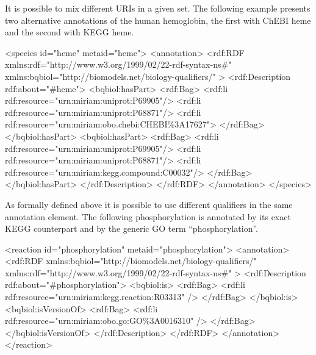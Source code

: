It is possible to mix different URIs in a given set. The
following example presents two alternative annotations of the human
hemoglobin, the first with ChEBI heme and the second with KEGG
heme.

\begin{blockChanged}
\begin{example}
<species id="heme" metaid="heme">
  <annotation>
    <rdf:RDF
      xmlns:rdf="http://www.w3.org/1999/02/22-rdf-syntax-ns\#"
      xmlns:bqbiol="http://biomodels.net/biology-qualifiers/"
    >
     <rdf:Description rdf:about="\#heme">
       <bqbiol:hasPart>
         <rdf:Bag>
           <rdf:li rdf:resource="urn:miriam:uniprot:P69905"/>
           <rdf:li rdf:resource="urn:miriam:uniprot:P68871"/>
           <rdf:li rdf:resource="urn:miriam:obo.chebi:CHEBI\%3A17627">
         </rdf:Bag>
       </bqbiol:hasPart>
       <bqbiol:hasPart>
         <rdf:Bag>
          <rdf:li rdf:resource="urn:miriam:uniprot:P69905"/>
           <rdf:li rdf:resource="urn:miriam:uniprot:P68871"/>
           <rdf:li rdf:resource="urn:miriam:kegg.compound:C00032"/>
         </rdf:Bag>
       </bqbiol:hasPart>
     </rdf:Description>
   </rdf:RDF>
  </annotation>
</species>
\end{example}
\end{blockChanged}

As formally defined above it is possible to use different
qualifiers in the same annotation element. The following
phosphorylation is annotated by its exact KEGG counterpart and by
the generic GO term ``phosphorylation''.

\begin{blockChanged}
\begin{example}
<reaction id="phosphorylation" metaid="phosphorylation">
  <annotation>
    <rdf:RDF
      xmlns:bqbiol="http://biomodels.net/biology-qualifiers/"
      xmlns:rdf="http://www.w3.org/1999/02/22-rdf-syntax-ns\#"
    >
      <rdf:Description rdf:about="\#phosphorylation">
        <bqbiol:is>
          <rdf:Bag>
            <rdf:li rdf:resource="urn:miriam:kegg.reaction:R03313" />
          </rdf:Bag>
        </bqbiol:is>
        <bqbiol:isVersionOf>
          <rdf:Bag>
            <rdf:li rdf:resource="urn:miriam:obo.go:GO\%3A0016310" />
          </rdf:Bag>
        </bqbiol:isVersionOf>
      </rdf:Description>
    </rdf:RDF>
  </annotation>
</reaction>
\end{example}
\end{blockChanged}
